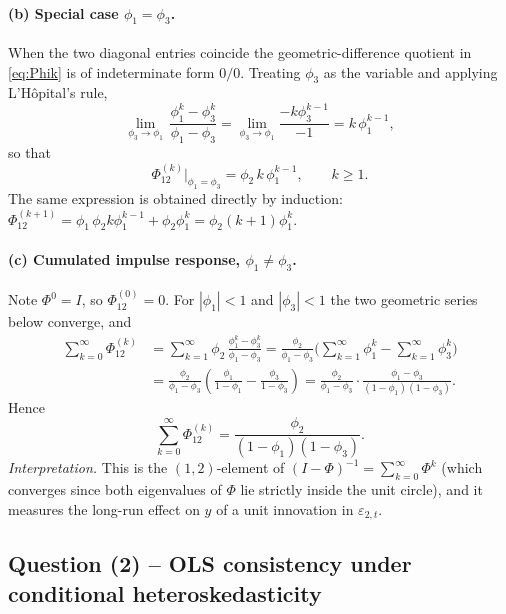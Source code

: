 \documentclass[12pt]{article}
\begin{document}
\paragraph{(b) Special case $\phi_1=\phi_3$.} When the two diagonal entries coincide the geometric-difference quotient in \eqref{eq:Phik} is of indeterminate form $0/0$. Treating $\phi_3$ as the variable and applying L'H\^{o}pital's rule,
\begin{equation*}
\lim_{\phi_3\to\phi_1}\,\frac{\phi_1^{k}-\phi_3^{k}}{\phi_1-\phi_3}
= \lim_{\phi_3\to\phi_1}\frac{-k\phi_3^{k-1}}{-1}
= k\,\phi_1^{k-1},
\end{equation*}
so that
\begin{equation}
\Phi^{(k)}_{12}\bigg|_{\phi_1=\phi_3} = \phi_2\,k\,\phi_1^{k-1},\qquad k\geq 1.\label{eq:Phik-equal}
\end{equation}
The same expression is obtained directly by induction: $\Phi^{(k+1)}_{12}=\phi_1\,\phi_2 k\phi_1^{k-1}+\phi_2\phi_1^{k}=\phi_2(k+1)\phi_1^{k}$.

\paragraph{(c) Cumulated impulse response, $\phi_1\neq\phi_3$.} Note $\Phi^{0}=I$, so $\Phi^{(0)}_{12}=0$. For $|\phi_1|<1$ and $|\phi_3|<1$ the two geometric series below converge, and
\begin{align*}
\sum_{k=0}^{\infty}\Phi^{(k)}_{12}
&= \sum_{k=1}^{\infty}\phi_2\,\frac{\phi_1^{k}-\phi_3^{k}}{\phi_1-\phi_3}
= \frac{\phi_2}{\phi_1-\phi_3}\Bigg(\sum_{k=1}^{\infty}\phi_1^{k}-\sum_{k=1}^{\infty}\phi_3^{k}\Bigg)\\
&= \frac{\phi_2}{\phi_1-\phi_3}\!\left(\frac{\phi_1}{1-\phi_1}-\frac{\phi_3}{1-\phi_3}\right)
= \frac{\phi_2}{\phi_1-\phi_3}\cdot\frac{\phi_1-\phi_3}{(1-\phi_1)(1-\phi_3)}.
\end{align*}
Hence
\begin{equation}
\sum_{k=0}^{\infty}\Phi^{(k)}_{12} = \frac{\phi_2}{(1-\phi_1)(1-\phi_3)}.\label{eq:cumIRF}
\end{equation}
\textit{Interpretation.} This is the $(1,2)$-element of $(I-\Phi)^{-1}=\sum_{k=0}^{\infty}\Phi^{k}$ (which converges since both eigenvalues of $\Phi$ lie strictly inside the unit circle), and it measures the long-run effect on $y$ of a unit innovation in $\varepsilon_{2,t}$.

\subsection*{Question (2) -- OLS consistency under conditional heteroskedasticity}\label{sec:p3-q2}
\end{document}
